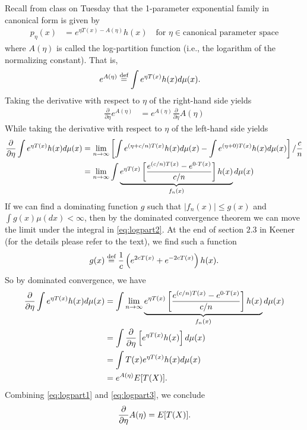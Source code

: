\documentclass[twoside]{article}
\newcommand{\defeq}{\buildrel \text{d{}ef}\over =}
\begin{document}
\begin{example}\citep[p.~29]{keener}
Recall from class on Tuesday that the 1-parameter exponential family in
canonical form is given by
\begin{align*}
  p_\eta(x) &= e^{\eta T(x) - A(\eta)} h(x) \quad \text{for }
  \eta \in \text{canonical parameter space}
\end{align*}
where $A(\eta)$ is called the log-partition function (i.e., the
logarithm of the normalizing constant).  That is,
\begin{align*}
  e^{A(\eta)} &\defeq \int e^{\eta T(x)} h(x) d\mu(x).
\end{align*}
Taking the derivative with respect to $\eta$ of the right-hand side yields
\begin{align}\label{eq:logpart1}
  \frac{\partial}{\partial \eta} e^{A(\eta)} &= e^{A(\eta)}
    \frac{\partial}{\partial \eta}A(\eta)
\end{align}
While taking the derivative with respect to $\eta$ of the left-hand side
yields
\begin{align}
  \frac{\partial}{\partial \eta} \int e^{\eta T(x)} h(x) d\mu(x)
  &= \lim_{n \rightarrow \infty} \left[ \int e^{(\eta + c/n)T(x)} h(x) d\mu(x) -
  \int e^{(\eta + 0)T(x)} h(x) d\mu(x) \right]/ \frac{c}{n} \notag\\
  &= \lim_{n \rightarrow \infty} \int \underbrace{e^{\eta T(x)} \left[
  \frac{e^{(c/n)T(x)} - e^{0 \cdot T(x)}}{c/n} \right] h(x)}_{f_n(x)} d\mu(x) \label{eq:logpart2}
\end{align}
If we can find a dominating function $g$ such that $|f_n(x)| \le g(x)$ and
$\int g(x) \mu(dx) < \infty$, then by the dominated convergence theorem we
can move the limit under the integral in \eqref{eq:logpart2}. At the end of
section $2.3$ in Keener (for the details please refer to the text), we find
such a function
\begin{align*}
g(x) \defeq \frac{1}{c} \left(e^{2cT(x)} + e^{-2cT(x)} \right)h(x).
\end{align*}
So by dominated convergence, we have
\begin{align}
   \frac{\partial}{\partial \eta} \int e^{\eta T(x)} h(x) d\mu(x)
  &=  \int \lim_{n \rightarrow \infty}\underbrace{e^{\eta T(x)} \left[
  \frac{e^{(c/n)T(x)} - e^{0 \cdot T(x)}}{c/n} \right] h(x)}_{f_n(x)} d\mu(x) \notag\\
  &= \int \frac{\partial}{\partial \eta} \left[e^{\eta T(x)} h(x)\right]  d\mu(x) \notag\\
  &= \int T(x) e^{\eta T(x)} h(x) d\mu(x)  \notag\\
  &= e^{A(\eta)} E[T(X)]. \label{eq:logpart3}
\end{align}
Combining \eqref{eq:logpart1} and \eqref{eq:logpart3}, we conclude
\begin{align*}
\frac{\partial}{\partial \eta} A(\eta) = E[T(X)].
\end{align*}
\end{example}




\end{document}

